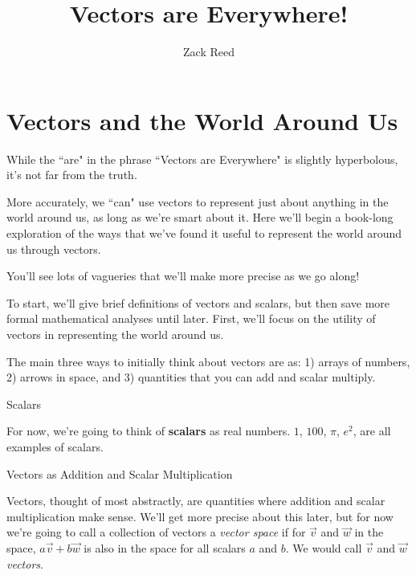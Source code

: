 \documentclass{ximera}
\author{Zack Reed}
\title{Vectors are Everywhere!}
\begin{document}
\begin{abstract}

\end{abstract}
\maketitle


\section{Vectors and the World Around Us}

While the ``are" in the phrase ``Vectors are Everywhere" is slightly hyperbolous, it's not far from the truth. 

More accurately, we ``can" use vectors to represent just about anything in the world around us, as long as we're smart about it. Here we'll begin a book-long exploration of the ways that we've found it useful to represent the world around us through vectors. 

You'll see lots of vagueries that we'll make more precise as we go along!

\begin{remark}

  To start, we'll give brief definitions of vectors and scalars, but then save more formal mathematical analyses until later. First, we'll focus on the utility of vectors in representing the world around us.

  The main three ways to initially think about vectors are as: 1) arrays of numbers, 2) arrows in space, and 3) quantities that you can add and scalar multiply.

  \begin{definition}{Scalars}

    For now, we're going to think of \textbf{scalars} as real numbers. $1$, $100$, $\pi$, $e^2$, are all examples of scalars.

  \end{definition}

  \begin{definition}{Vectors as Addition and Scalar Multiplication}

    Vectors, thought of most abstractly, are quantities where addition and scalar multiplication make sense. We'll get more precise about this later, but for now we're going to call a collection of vectors a \textit{vector space} if for $\vec{v}$ and $\vec{w}$ in the space, $a\vec{v}+b\vec{w}$ is also in the space for all scalars $a$ and $b$. We would call $\vec{v}$ and $\vec{w}$ \textit{vectors}.

  \end{definition}

\end{remark}
\end{document}
